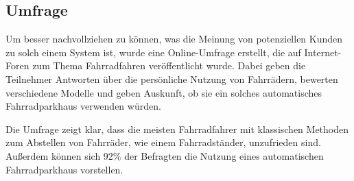 \subsection{Umfrage}
Um besser nachvollziehen zu können, was die Meinung von potenziellen Kunden zu solch einem System ist, wurde eine Online-Umfrage erstellt, die auf Internet-Foren zum Thema Fahrradfahren veröffentlicht wurde. Dabei geben die Teilnehmer Antworten über die persönliche Nutzung von Fahrrädern, bewerten verschiedene Modelle und geben Auskunft, ob sie ein solches automatisches Fahrradparkhaus verwenden würden.

\noindent Die Umfrage zeigt klar, dass die meisten Fahrradfahrer mit klassischen Methoden zum Abstellen von Fahrräder, wie einem Fahrradständer, unzufrieden sind. Außerdem können sich 92\% der Befragten die Nutzung eines automatischen Fahrradparkhaus vorstellen.
